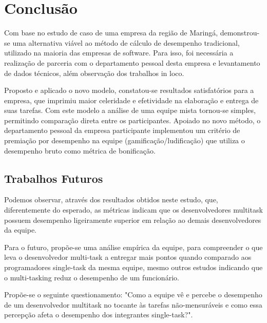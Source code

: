 \section{Conclusão}
Com base no estudo de caso de uma empresa da região de Maringá, demonstrou-se uma alternativa viável ao método de cálculo de desempenho tradicional, utilizado na maioria das empresas de software. Para isso, foi necessária a realização de parceria com o departamento pessoal desta empresa e levantamento de dados técnicos, além observação dos trabalhos in loco.\par

Proposto e aplicado o novo modelo, constatou-se resultados satisfatórios para a empresa, que imprimiu maior celeridade e efetividade na elaboração e entrega de suas tarefas. Com este modelo a análise de uma equipe mista tornou-se simples, permitindo comparação direta entre os participantes. Apoiado no novo método, o departamento pessoal da empresa participante implementou um critério de premiação por desempenho na equipe (gamificação/ludificação) que utiliza o desempenho bruto como métrica de bonificação.\par


\subsection{Trabalhos Futuros}
Podemos observar, através dos resultados obtidos neste estudo, que, diferentemente do esperado, as métricas indicam que os desenvolvedores multitask possuem desempenho ligeiramente superior em relação ao demais desenvolvedores da equipe.\par

Para o futuro, propõe-se uma análise empírica da equipe, para compreender o que leva o desenvolvedor multi-task a entregar mais pontos quando comparado aos programadores single-task da mesma equipe, mesmo outros estudos indicando que o multi-tasking reduz o desempenho de um funcionário.\par 

Propõe-se o seguinte questionamento: "Como a equipe vê e percebe o desempenho de um desenvolvedor multitask no tocante às tarefas não-mensuráveis e como essa percepção afeta o desempenho dos integrantes single-task?".